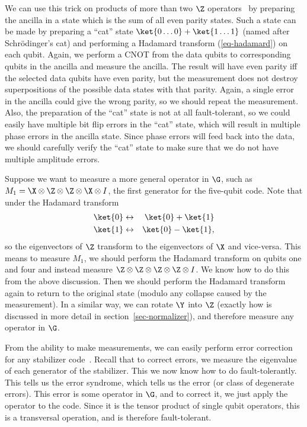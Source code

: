 We can use this trick on products of more than two $\Z$
operators~\cite{shor-fault-tol} by preparing the ancilla in a state which is
the sum of all even parity states.  Such a state can be made by preparing a
``cat'' state $\ket{0 \ldots 0} + \ket{1 \ldots 1}$ (named after
Schr\"odinger's cat) and performing a Hadamard transform
(\ref{eq-hadamard}) on each qubit.  Again, we perform a CNOT from the
data qubits to corresponding qubits in the ancilla and measure the ancilla.
The result will have even parity iff the selected data qubits have even
parity, but the measurement does not destroy superpositions of the
possible data states with that parity.  Again, a single error in the ancilla
could give the wrong parity, so we should repeat the measurement.  Also,
the preparation of the ``cat'' state is not at all fault-tolerant, so we could
easily have multiple bit flip errors in the ``cat'' state, which will result
in multiple phase errors in the ancilla state.  Since phase errors will feed
back into the data, we should carefully verify the ``cat'' state to make sure
that we do not have multiple amplitude errors.

Suppose we want to measure a more general operator in $\G$, such as
$M_1 = \X \otimes\Z \otimes \Z \otimes \X \otimes I$, the first generator
for the five-qubit code.  Note that under the Hadamard transform
\begin{eqnarray}
	\ket{0} & \leftrightarrow & \ket{0} + \ket{1} \nonumber \\
	\ket{1} & \leftrightarrow & \ket{0} - \ket{1},
\end{eqnarray}
so the eigenvectors of $\Z$ transform to the eigenvectors of $\X$ and
vice-versa.  This means to measure $M_1$, we should perform the
Hadamard transform on qubits one and four and instead measure $\Z
\otimes \Z \otimes \Z \otimes \Z \otimes I$.  We know how to do this from
the above discussion.  Then we should perform the Hadamard transform
again to return to the original state (modulo any collapse caused by the
measurement).  In a similar way, we can rotate $\Y$ into $\Z$ (exactly
how is discussed in more detail in section~\ref{sec-normalizer}), and
therefore measure any operator in $\G$.

From the ability to make measurements, we can easily perform error
correction for any stabilizer code~\cite{divincenzo}.  Recall that to correct
errors, we measure the eigenvalue of each generator of the stabilizer.  This
we now know how to do fault-tolerantly.  This tells us the error syndrome,
which tells us the error (or class of degenerate errors).  This error is some
operator in $\G$, and to correct it, we just apply the operator to the code.
Since it is the tensor product of single qubit operators, this is a transversal
operation, and is therefore fault-tolerant.

